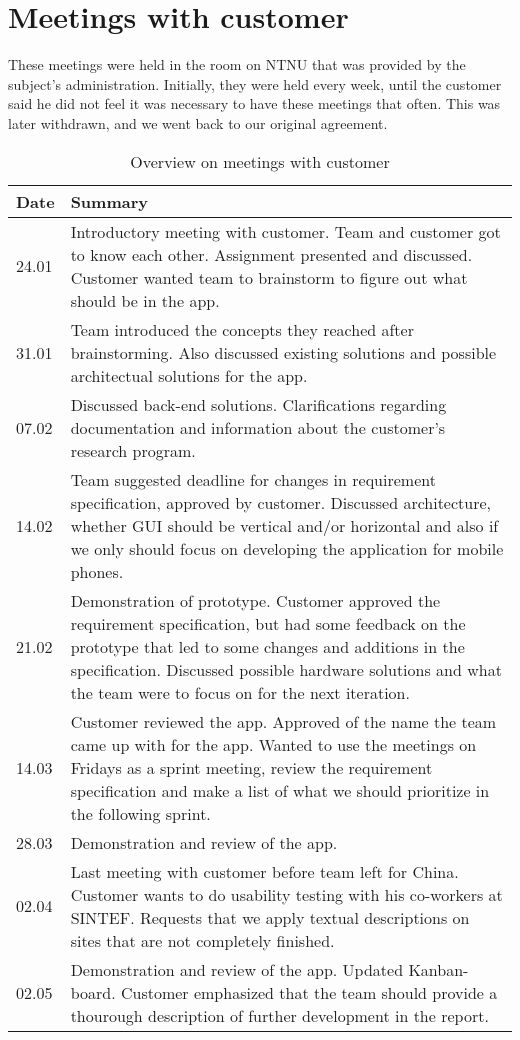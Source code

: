 \section{Meetings with customer}
These meetings were held in the room on NTNU that was provided by the subject's administration. Initially, they were held every week, until the customer said he did not feel it was necessary to have these meetings that often. This was later withdrawn, and we went back to our original agreement.
\begin{table}[H]
\centering
\begin{tabular}{|l|p{14.7cm}|}
\hline
\textbf{Date}&\textbf{Summary}\\\hline
24.01& Introductory meeting with customer. Team and customer got to know each other. Assignment presented and discussed. Customer wanted team to brainstorm to figure out what should be in the app.\\\hline
31.01& Team introduced the concepts they reached after brainstorming. Also discussed existing solutions and possible architectual solutions for the app.\\\hline
07.02& Discussed back-end solutions. Clarifications regarding documentation and information about the customer's research program.\\\hline
14.02& Team suggested deadline for changes in requirement specification, approved by customer. Discussed architecture, whether GUI should be vertical and/or horizontal and also if we only should focus on developing the application for mobile phones.\\\hline
21.02&Demonstration of prototype. Customer approved the requirement specification, but had some feedback on the prototype that led to some changes and additions in the specification. Discussed possible hardware solutions and what the team were to focus on for the next iteration. \\\hline
14.03& Customer reviewed the app. Approved of the name the team came up with for the app. Wanted to use the meetings on Fridays as a sprint meeting, review the requirement specification and make a list of what we should prioritize in the following sprint.\\\hline
28.03& Demonstration and review of the app.\\\hline
02.04& Last meeting with customer before team left for China. Customer wants to do usability testing with his co-workers at SINTEF. Requests that we apply textual descriptions on sites that are not completely finished.\\\hline
02.05& Demonstration and review of the app. Updated Kanban-board. Customer emphasized that the team should provide a thourough description of further development in the report. \\\hline
\end{tabular}
\caption{Overview on meetings with customer}
\end{table}







